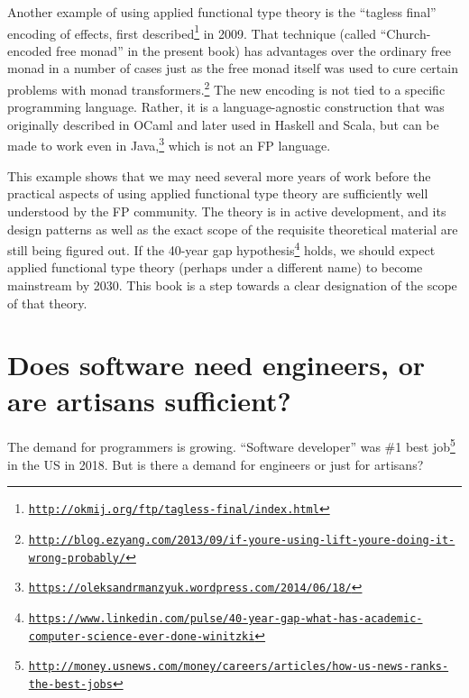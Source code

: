 Another example of using applied functional type theory is the  \textsf{``}tagless
final\textsf{''} encoding of effects, first described\footnote{\texttt{\href{http://okmij.org/ftp/tagless-final/index.html}{http://okmij.org/ftp/tagless-final/index.html}}}
in 2009. That technique (called \textsf{``}Church-encoded free monad\textsf{''}
in the present book) has advantages over the ordinary free monad in
a number of cases \textemdash{} just as the free monad itself was
used to cure certain problems with monad transformers.\footnote{\texttt{\href{http://blog.ezyang.com/2013/09/if-youre-using-lift-youre-doing-it-wrong-probably/}{http://blog.ezyang.com/2013/09/if-youre-using-lift-youre-doing-it-wrong-probably/}}}
The new encoding is not tied to a specific programming language. Rather,
it is a language-agnostic construction that was originally described
in OCaml and later used in Haskell and Scala, but can be made to work
even in Java,\footnote{\texttt{\href{https://oleksandrmanzyuk.wordpress.com/2014/06/18/}{https://oleksandrmanzyuk.wordpress.com/2014/06/18/}}}
which is not an FP language.

This example shows that we may need several more years of work before
the practical aspects of using applied functional type theory are
sufficiently well understood by the FP community. The theory is in
active development, and its design patterns \textemdash{} as well
as the exact scope of the requisite theoretical material \textemdash{}
are still being figured out. If the 40-year gap hypothesis\footnote{\texttt{\href{https://www.linkedin.com/pulse/40-year-gap-what-has-academic-computer-science-ever-done-winitzki}{https://www.linkedin.com/pulse/40-year-gap-what-has-academic-computer-science-ever-done-winitzki}}}
holds, we should expect applied functional type theory (perhaps under
a different name) to become mainstream by 2030. This book is a step
towards a clear designation of the scope of that theory.

\section{Does software need engineers, or are artisans sufficient? }

The demand for programmers is growing. \textsf{``}Software developer\textsf{''} was
\#1 best job\footnote{\texttt{\href{http://money.usnews.com/money/careers/articles/how-us-news-ranks-the-best-jobs}{http://money.usnews.com/money/careers/articles/how-us-news-ranks-the-best-jobs}}}
in the US in 2018. But is there a demand for engineers or just for
artisans?

